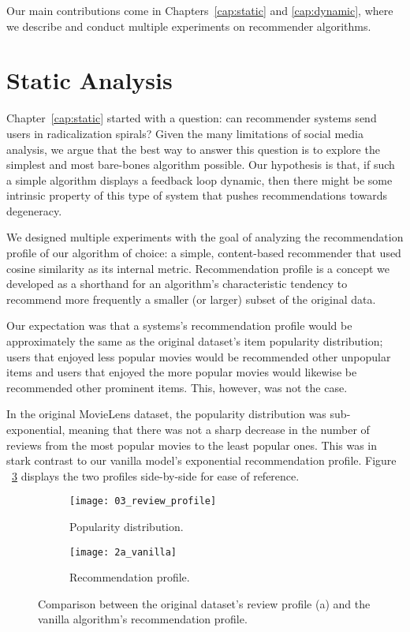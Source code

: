 Our main contributions come in Chapters~\ref{cap:static} and \ref{cap:dynamic},
where we describe and conduct multiple experiments on recommender algorithms.

\section{Static Analysis}
\label{sec:static}

Chapter~\ref{cap:static} started with a question: can recommender systems send
users in radicalization spirals? Given the many limitations of social media
analysis, we argue that the best way to answer this question is to explore the
simplest and most bare-bones algorithm possible. Our hypothesis is that, if such
a simple algorithm displays a feedback loop dynamic, then there might be some
intrinsic property of this type of system that pushes recommendations towards
degeneracy.

We designed multiple experiments with the goal of analyzing the recommendation
profile of our algorithm of choice: a simple, content-based recommender that
used cosine similarity as its internal metric. Recommendation profile is a
concept we developed as a shorthand for an algorithm's characteristic tendency
to recommend more frequently a smaller (or larger) subset of the original data.

Our expectation was that a systems's recommendation profile would be
approximately the same as the original dataset's item popularity distribution;
users that enjoyed less popular movies would be recommended other unpopular
items and users that enjoyed the more popular movies would likewise be
recommended other prominent items. This, however, was not the case.

In the original MovieLens \citep{harper_movielens_2015} dataset, the popularity
distribution was sub-exponential, meaning that there was not a sharp decrease in
the number of reviews from the most popular movies to the least popular ones.
This was in stark contrast to our vanilla model's exponential recommendation
profile. Figure ~\ref{fig:fig05_profile_comparison} displays the two profiles
side-by-side for ease of reference.

\begin{figure}
  \centering
  \begin{subfigure}{0.45\textwidth}
    \centering
    \texttt{[image: 03\_review\_profile]}
    \caption{Popularity distribution.\label{fig:fig05_review_profile}}
  \end{subfigure}
  \begin{subfigure}{0.45\textwidth}
    \centering
    \texttt{[image: 2a\_vanilla]}
    \caption{Recommendation profile.\label{fig:fig05_vanilla_profile}}
  \end{subfigure}
  \caption{Comparison between the original dataset's review profile (a) and the
  vanilla algorithm's recommendation
  profile.\label{fig:fig05_profile_comparison}}
\end{figure}


